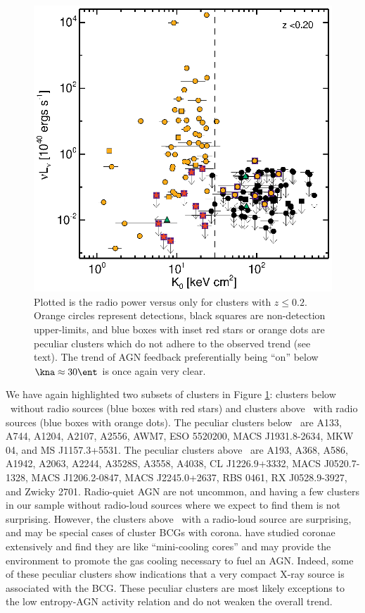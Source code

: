 \documentclass{emulateapj}
\begin{document}
\begin{figure}
  \begin{center}
    \includegraphics*[width=\columnwidth, trim=30mm 7mm 40mm 17mm, clip]{radio_zcut}
    \caption{Plotted is the radio power versus \kna only for clusters
      with $z \leq 0.2$. Orange circles represent detections, black
      squares are non-detection upper-limits, and blue boxes with
      inset red stars or orange dots are peculiar clusters which do
      not adhere to the observed trend (see text). The trend of AGN
      feedback preferentially being ``on'' below $\kna \approx 30
      \ent$ is once again very clear.}
    \label{fig:radzcut}
  \end{center}
\end{figure}

We have again highlighted two subsets of clusters in Figure
\ref{fig:radzcut}: clusters below \kthr\ without radio sources (blue
boxes with red stars) and clusters above \kthr\ with radio sources
(blue boxes with orange dots). The peculiar clusters below \kthr\ are
A133, A744, A1204, A2107, A2556, AWM7, ESO 5520200, MACS J1931.8-2634,
MKW 04, and MS J1157.3+5531. The peculiar clusters above \kthr\ are
A193, A368, A586, A1942, A2063, A2244, A3528S, A3558, A4038, CL
J1226.9+3332, MACS J0520.7-1328, MACS J1206.2-0847, MACS J2245.0+2637,
RBS 0461, RX J0528.9-3927, and Zwicky 2701. Radio-quiet AGN are not
uncommon, and having a few clusters in our sample without radio-loud
sources where we expect to find them is not surprising.  However, the
clusters above \kthr\ with a radio-loud source are surprising, and may
be special cases of cluster BCGs with corona.  \cite{coronae} have
studied coronae extensively and find they are like ``mini-cooling
cores'' and may provide the environment to promote the gas cooling
necessary to fuel an AGN. Indeed, some of these peculiar clusters show
indications that a very compact X-ray source is associated with the
BCG. These peculiar clusters are most likely exceptions to the low
entropy-AGN activity relation and do not weaken the overall trend.
\end{document}
